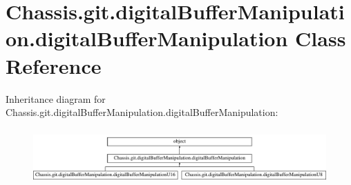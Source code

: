 \hypertarget{class_chassis_8git_1_1digital_buffer_manipulation_1_1digital_buffer_manipulation}{\section{Chassis.\-git.\-digital\-Buffer\-Manipulation.\-digital\-Buffer\-Manipulation Class Reference}
\label{class_chassis_8git_1_1digital_buffer_manipulation_1_1digital_buffer_manipulation}
}
Inheritance diagram for Chassis.\-git.\-digital\-Buffer\-Manipulation.\-digital\-Buffer\-Manipulation\-:\begin{figure}[H]
\begin{center}
\leavevmode
\includegraphics[height=2.148338cm]{class_chassis_8git_1_1digital_buffer_manipulation_1_1digital_buffer_manipulation}
\end{center}
\end{figure}
